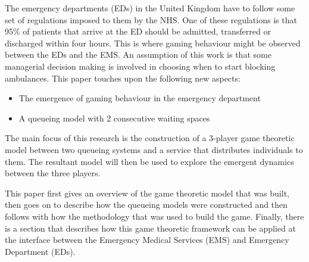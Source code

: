 The emergency departments (EDs) in the United Kingdom have to follow some set 
of regulations imposed to them by the NHS.
One of these regulations is that 95\% of patients that arrive at the ED should 
be admitted, transferred or discharged within four hours.
This is where gaming behaviour might be observed between the EDs and the EMS.
An assumption of this work is that some managerial decision making is involved
in choosing when to start blocking ambulances.
This paper touches upon the following new aspects:
\begin{itemize}
    \item The emergence of gaming behaviour in the emergency department
    \item A queueing model with 2 consecutive waiting spaces
\end{itemize}

The main focus of this research is the construction of a 3-player game 
theoretic model between two queueing systems and a service that distributes 
individuals to them. 
The resultant model will then be used to explore the emergent dynamics between 
the three players.

This paper first gives an overview of the game theoretic model that was built, 
then goes on to describe how the queueing models were constructed and then 
follows with how the methodology that was used to build the game.
Finally, there is a section that describes how this game theoretic framework
can be applied at the interface between the Emergency Medical Services (EMS) 
and Emergency Department (EDs).





